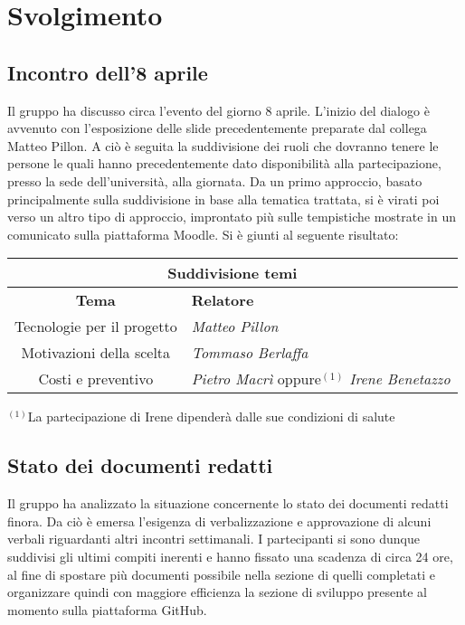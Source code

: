     \section{Svolgimento}

    \subsection {Incontro dell'8 aprile}
    Il gruppo ha discusso circa l'evento del giorno 8 aprile. L'inizio del dialogo è avvenuto con l'esposizione delle slide precedentemente preparate dal collega Matteo Pillon.
    \newline
    \newline
    A ciò è seguita la suddivisione dei ruoli che dovranno tenere le persone le quali hanno precedentemente dato disponibilità alla partecipazione, presso la sede dell'università, alla giornata.
    Da un primo approccio, basato principalmente sulla suddivisione in base alla tematica trattata, si è virati poi verso un altro tipo di approccio, improntato più sulle tempistiche mostrate in un comunicato sulla piattaforma Moodle.
    \newline
    Si è giunti al seguente risultato:
    \renewcommand{\arraystretch}{1.8} %
    \begin{center}
    \begin{tabular}{ |c|l| }
        \hline \multicolumn{2}{|c|}{\textbf{Suddivisione temi}} \\
        \hline
        \textbf{Tema} & \textbf{Relatore}\\
        \hline
        Tecnologie per il progetto & \textit{Matteo Pillon}\\
        \hline
        Motivazioni della scelta & \textit{Tommaso Berlaffa}\\
        \hline
        Costi e preventivo & \textit{Pietro Macrì} oppure$^{(1)}$ \textit{Irene Benetazzo}\\
        \hline
    \end{tabular}
    \newline
    \end{center}
    \newline $^{(1)}$La partecipazione di Irene dipenderà dalle sue condizioni di salute

    \subsection {Stato dei documenti redatti}
    Il gruppo ha analizzato la situazione concernente lo stato dei documenti redatti finora. Da ciò è emersa l'esigenza
    di verbalizzazione e approvazione di alcuni verbali riguardanti altri incontri settimanali.
    \newline
    I partecipanti si sono dunque suddivisi gli ultimi compiti inerenti e hanno fissato una scadenza di circa 24 ore, al
    fine di spostare più documenti possibile nella sezione di quelli completati e organizzare quindi con maggiore efficienza
    la sezione di sviluppo presente al momento sulla piattaforma GitHub.

    \vspace{1em} 

    